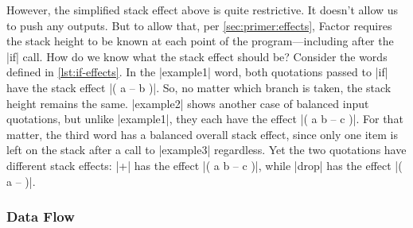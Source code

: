 
However, the simplified stack effect above is quite restrictive.  It doesn't
allow us to push any outputs.  But to allow that, per
\cref{sec:primer:effects}, Factor requires the stack height to be known at each
point of the program---including after the \factor|if| call.  How do we know
what the stack effect should be?  Consider the words defined in
\vref{lst:if-effects}.  In the \factor|example1| word, both quotations passed
to \factor|if| have the stack effect
%
\factor|( a -- b )|.
%
So, no matter which branch is taken, the stack height remains the same.
\factor|example2| shows another case of balanced input quotations, but unlike
\factor|example1|, they each have the effect
%
\factor|( a b -- c )|.
%
For that matter, the third word has a balanced overall stack effect, since only
one item is left on the stack after a call to \factor|example3| regardless.
Yet the two quotations have different stack effects: \factor|+| has the effect
%
\factor|( a b -- c )|,
%
while \factor|drop| has the effect
%
\factor|( a -- )|.

\subsubsection{Data Flow}\label{sec:primer:data-flow}
